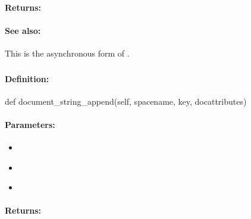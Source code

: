 \paragraph{Returns:}


\paragraph{See also:}  This is the asynchronous form of .

\pagebreak
\subsubsection{}
\label{api:python:document_string_append}


\paragraph{Definition:}
\begin{pythoncode}
def document_string_append(self, spacename, key, docattributes)
\end{pythoncode}

\paragraph{Parameters:}
\begin{itemize}[noitemsep]
\item {}\\

\item {}\\

\item {}\\

\end{itemize}

\paragraph{Returns:}


